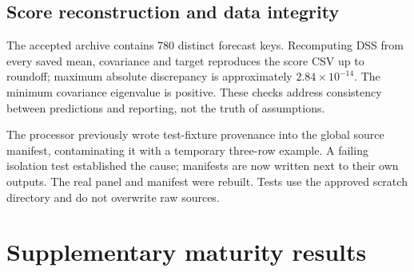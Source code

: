 \documentclass[
  12pt,
  letterpaper,
  DIV=11,
  numbers=noendperiod]{scrreprt}
\begin{document}
\section{Score reconstruction and data
integrity}\label{score-reconstruction-and-data-integrity}

The accepted archive contains 780 distinct forecast keys. Recomputing
DSS from every saved mean, covariance and target reproduces the score
CSV up to roundoff; maximum absolute discrepancy is approximately
\(2.84\times10^{-14}\). The minimum covariance eigenvalue is positive.
These checks address consistency between predictions and reporting, not
the truth of assumptions.

The processor previously wrote test-fixture provenance into the global
source manifest, contaminating it with a temporary three-row example. A
failing isolation test established the cause; manifests are now written
next to their own outputs. The real panel and manifest were rebuilt.
Tests use the approved scratch directory and do not overwrite raw
sources.

\chapter*{Supplementary maturity
results}\label{supplementary-maturity-results}
\end{document}
